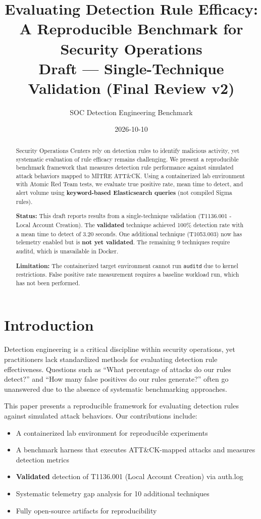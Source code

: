 \documentclass[11pt,a4paper]{article}
\title{Evaluating Detection Rule Efficacy: A Reproducible Benchmark for Security Operations\\
\large{Draft --- Single-Technique Validation (Final Review v2)}}
\author{SOC Detection Engineering Benchmark}
\date{2026-10-10}
\begin{document}
\maketitle

\begin{abstract}
Security Operations Centers rely on detection rules to identify malicious activity, yet systematic evaluation of rule efficacy remains challenging. We present a reproducible benchmark framework that measures detection rule performance against simulated attack behaviors mapped to MITRE ATT\&CK. Using a containerized lab environment with Atomic Red Team tests, we evaluate true positive rate, mean time to detect, and alert volume using \textbf{keyword-based Elasticsearch queries} (not compiled Sigma rules).

\textbf{Status:} This draft reports results from a single-technique validation (T1136.001 - Local Account Creation). The \textbf{validated} technique achieved 100\% detection rate with a mean time to detect of 3.20 seconds. One additional technique (T1053.003) now has telemetry enabled but is \textbf{not yet validated}. The remaining 9 techniques require auditd, which is unavailable in Docker.

\textbf{Limitation:} The containerized target environment cannot run \texttt{auditd} due to kernel restrictions. False positive rate measurement requires a baseline workload run, which has not been performed.
\end{abstract}

\section{Introduction}

Detection engineering is a critical discipline within security operations, yet practitioners lack standardized methods for evaluating detection rule effectiveness. Questions such as ``What percentage of attacks do our rules detect?'' and ``How many false positives do our rules generate?'' often go unanswered due to the absence of systematic benchmarking approaches.

This paper presents a reproducible framework for evaluating detection rules against simulated attack behaviors. Our contributions include:

\begin{itemize}
    \item A containerized lab environment for reproducible experiments
    \item A benchmark harness that executes ATT\&CK-mapped attacks and measures detection metrics
    \item \textbf{Validated} detection of T1136.001 (Local Account Creation) via auth.log
    \item Systematic telemetry gap analysis for 10 additional techniques
    \item Fully open-source artifacts for reproducibility
\end{itemize}
\end{document}

